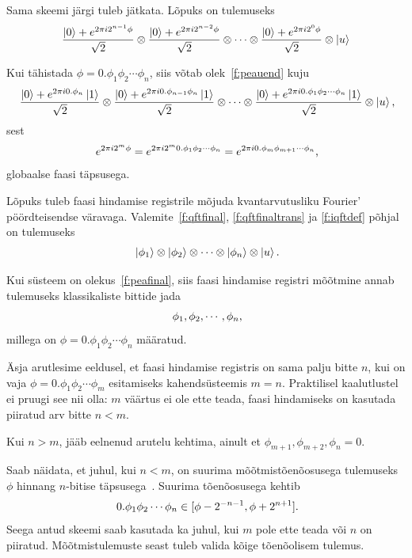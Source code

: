 \documentclass[12pt]{report}
\def\ket#1{\mathinner{|#1\rangle}}
\begin{document}
Sama skeemi järgi tuleb jätkata.
Lõpuks on tulemuseks
\begin{align}\label{f:peauend}
    \frac{\ket{0}+ e^{2\pi i2^{n-1}\phi}}{\sqrt{2}}
    \otimes \frac{\ket{0}+ e^{2\pi i2^{n-2}\phi}}{\sqrt{2}}
    \otimes\cdots
    \otimes \frac{\ket{0}+ e^{2\pi i2^0\phi}}{\sqrt{2}}
    \otimes\ket{u}
\end{align}

Kui tähistada \(\phi=0.\phi_1\phi_2\cdots\phi_n\), siis võtab olek~\ref{f:peauend} kuju
\begin{align}
    \frac{\ket{0}+ e^{2\pi i0.\phi_n}\ket{1}}{\sqrt{2}}
    \otimes \frac{\ket{0}+ e^{2\pi i0.\phi_{n-1}\phi_n}\ket{1}}{\sqrt{2}}
    \otimes\cdots
    \otimes \frac{\ket{0}+ e^{2\pi i0.\phi_1\phi_2\cdots\phi_n}\ket{1}}{\sqrt{2}}
    \otimes\ket{u} \rlap{,}
\end{align}
sest
\begin{align}
    e^{2\pi i2^m\phi}
    = e^{2\pi i2^m 0.\phi_1\phi_2\cdots\phi_n}
    = e^{2\pi i0.\phi_m\phi_{m+1}\cdots\phi_n} \rlap{,}
\end{align}
globaalse faasi täpsusega.

Lõpuks tuleb faasi hindamise registrile mõjuda kvantarvutusliku Fourier' pöördteisendse väravaga.
Valemite~\ref{f:qftfinal}, \ref{f:qftfinaltrans} ja \ref{f:iqftdef} põhjal on tulemuseks
\begin{align}\label{f:peafinal}
    \ket{\phi_1} \otimes \ket{\phi_2} \otimes \cdots \otimes \ket{\phi_n} \otimes \ket{u} \rlap{.}
\end{align}

Kui süsteem on olekus~\ref{f:peafinal}, siis faasi hindamise registri mõõtmine annab tulemuseks klassikaliste bittide jada
\begin{align}
    \phi_1, \phi_2, \cdots, \phi_n \rlap{,}
\end{align}
millega on \(\phi = 0.\phi_1\phi_2 \cdots \phi_n\) määratud.

Äsja arutlesime eeldusel, et faasi hindamise registris on sama palju bitte \(n\), kui on vaja \(\phi = 0.\phi_1\phi_2 \cdots \phi_m\) esitamiseks kahendsüsteemis \(m = n\).
Praktilisel kaalutlustel ei pruugi see nii olla: \(m\) väärtus ei ole ette teada, faasi hindamiseks on kasutada piiratud arv bitte \(n < m\).

Kui \(n > m\), jääb eelnenud arutelu kehtima, ainult et \(\phi_{m+1}, \phi_{m+2}, \phi_n = 0\).

Saab näidata, et juhul, kui \(n < m\), on suurima mõõtmistõenõosusega tulemuseks \(\phi\) hinnang \(n\)-bitise täpsusega~\cite{kaye+laflamme+mosca}.
Suurima tõenõosusega kehtib
\begin{equation}
    0.\phi_1\phi_2\cdots\phi_n \in [\phi - 2^{-n-1}, \phi + 2^{n+1}] \rlap{.}
\end{equation}
Seega antud skeemi saab kasutada ka juhul, kui \(m\) pole ette teada või \(n\) on piiratud.
Mõõtmis\-tulemuste seast tuleb valida kõige tõenõolisem tulemus.
\end{document}
